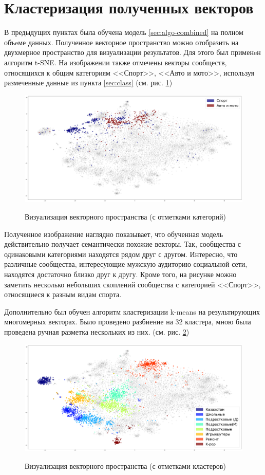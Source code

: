 \documentclass[times,specification,annotation]{itmo-student-thesis}
\begin{document}
\section{Кластеризация полученных векторов}\label{sec:visual}

В предыдущих пунктах была обучена модель \ref{sec:algo-combined} на полном объeме данных. Полученное векторное пространство можно отобразить на двухмерное пространство для визуализации результатов. Для этого был применeн алгоритм t-SNE. На изображении также отмечены векторы сообществ, относящихся к общим категориям <<Спорт>>, <<Авто и мото>>, используя размеченные данные из пункта \ref{sec:class} (см. рис. \ref{pic:categories})

\begin{figure}[h]
\caption{Визуализация векторного пространства (с отметками категорий)}
\centering
\includegraphics[width=1\textwidth]{index0}
\label{pic:categories}
\end{figure}

Полученное изображение наглядно показывает, что обученная модель действительно получает семантически похожие векторы. Так, сообщества с одинаковыми категориями находятся рядом друг с другом. Интересно, что различные сообщества, интересующие мужскую аудиторию социальной сети, находятся достаточно близко друг к другу. Кроме того, на рисунке можно заметить несколько небольших скоплений сообщества с категорией <<Спорт>>, относящиеся к разным видам спорта.  

Дополнительно был обучен алгоритм кластеризации k-means на результирующих многомерных векторах. Было проведено разбиение на 32 кластера, мною была проведена ручная разметка нескольких из них. (см. рис. \ref{pic:clusters})

\begin{figure}[h]
\caption{Визуализация векторного пространства (с отметками кластеров)}
\centering
\includegraphics[width=1\textwidth]{clusters}
\label{pic:clusters}
\end{figure}
\end{document}
